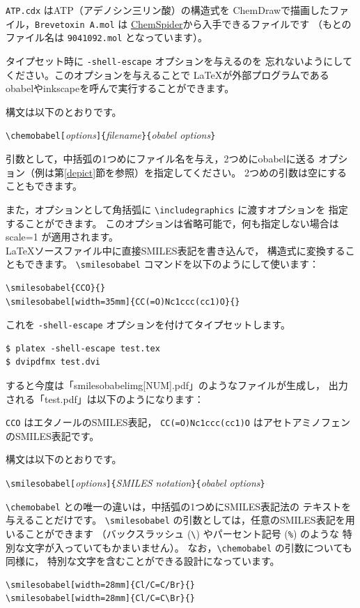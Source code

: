 \documentclass[12pt]{ltjsarticle}
\begin{document}
\verb|ATP.cdx| はATP（アデノシン三リン酸）の構造式を
ChemDrawで描画したファイル，\verb|Brevetoxin A.mol| は
\href{http://www.chemspider.com/}{ChemSpider}から入手できるファイルです
（もとのファイル名は \verb|9041092.mol| となっています）。

タイプセット時に \verb|-shell-escape| オプションを与えるのを
忘れないようにしてください。このオプションを与えることで
\LaTeX が外部プログラムであるobabelやinkscapeを呼んで実行することができます。

構文は以下のとおりです。
\begin{center}
\verb|\chemobabel[|\textit{options}\verb|]{|\textit{filename}\verb|}{|\textit{obabel options}\verb|}|
\end{center}
引数として，中括弧の1つめにファイル名を与え，2つめにobabelに送る
オプション（例は第\ref{depict}節を参照）を指定してください。
2つめの引数は空にすることもできます。

また，オプションとして角括弧に \verb|\includegraphics| に渡すオプションを
指定することができます。
このオプションは省略可能で，何も指定しない場合は scale=1 が適用されます。 \\

\LaTeX ソースファイル中に直接SMILES表記を書き込んで，
構造式に変換することもできます。
\verb|\smilesobabel| コマンドを以下のようにして使います：
\begin{verbatim}
\smilesobabel{CCO}{}
\smilesobabel[width=35mm]{CC(=O)Nc1ccc(cc1)O}{}
\end{verbatim}
これを \verb|-shell-escape| オプションを付けてタイプセットします。
\begin{verbatim}
$ platex -shell-escape test.tex
$ dvipdfmx test.dvi
\end{verbatim}
すると今度は「smilesobabelimg[NUM].pdf」のようなファイルが生成し，
出力される「test.pdf」は以下のようになります： \\
\begin{figure}[h]
  \centering
   \quad
\end{figure}
\verb|CCO| はエタノールのSMILES表記，
\verb|CC(=O)Nc1ccc(cc1)O| はアセトアミノフェンのSMILES表記です。

構文は以下のとおりです。
\begin{center}
\verb|\smilesobabel[|\textit{options}\verb|]{|\textit{SMILES notation}\verb|}{|\textit{obabel options}\verb|}|
\end{center}
\verb|\chemobabel| との唯一の違いは，中括弧の1つめにSMILES表記法の
テキストを与えることだけです。
\verb|\smilesobabel| の引数としては，任意のSMILES表記を用いることができます
（バックスラッシュ (\verb|\|) やパーセント記号 (\verb|%|) のような
特別な文字が入っていてもかまいません）。
なお，\verb|\chemobabel| の引数についても同様に，
特別な文字を含むことができる設計になっています。
\begin{verbatim}
\smilesobabel[width=28mm]{Cl/C=C/Br}{}
\smilesobabel[width=28mm]{Cl/C=C\Br}{}
\end{verbatim}
\begin{figure}[h]
  \centering
   \quad
\end{figure}
\end{document}
